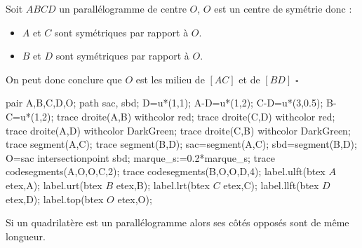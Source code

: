 \begin{changemargin}{0mm}{-15mm}
\begin{preuve}
        \begin{minipage}{0.65\linewidth}
            Soit $ABCD$ un parallélogramme de centre $O$, $O$ est un centre de symétrie donc :
            \begin{itemize}
                \item $A$ et $C$ sont symétriques par rapport à $O$.
                \item $B$ et $D$ sont symétriques par rapport à $O$.
            \end{itemize}
            On peut donc conclure que $O$ est les milieu de $[AC]$ et de $[BD]$ $\square$
        \end{minipage}
        \begin{minipage}{0.35\linewidth}
            \begin{Geometrie}[CoinBG={(0.5u,0.5u)},CoinHD={(5.5u,4u)}]
                pair A,B,C,D,O;
                path sac, sbd;
                D=u*(1,1);
                A-D=u*(1,2);
                C-D=u*(3,0.5);
                B-C=u*(1,2); 
                trace droite(A,B) withcolor red;
                trace droite(C,D) withcolor red;
                trace droite(A,D) withcolor DarkGreen;
                trace droite(C,B) withcolor DarkGreen;
                trace segment(A,C);
                trace segment(B,D);
                sac=segment(A,C);
                sbd=segment(B,D);
                O=sac intersectionpoint sbd;
                marque_s:=0.2*marque_s;
                trace codesegments(A,O,O,C,2);
                trace codesegments(B,O,O,D,4);
                label.ulft(btex $A$ etex,A);
                label.urt(btex $B$ etex,B);
                label.lrt(btex $C$ etex,C);
                label.llft(btex $D$ etex,D);
                label.top(btex $O$ etex,O);
            \end{Geometrie}
        \end{minipage}
    \end{preuve}
    \begin{propriete}
        Si un quadrilatère est un parallélogramme alors ses côtés opposés sont de même longueur.
    \end{propriete}
    \begin{preuve}
        \phantom{rrr}


\end{preuve}
\end{changemargin}
